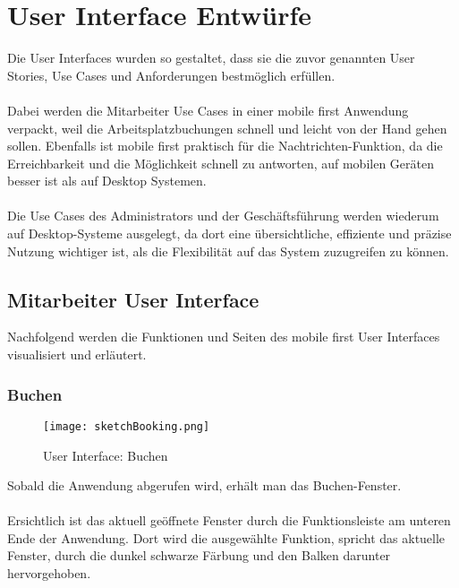 \section{User Interface Entwürfe}

Die User Interfaces wurden so gestaltet, dass sie die zuvor genannten User Stories, Use Cases und Anforderungen bestmöglich erfüllen. 
\paragraph{}Dabei werden die Mitarbeiter Use Cases in einer mobile first Anwendung verpackt, weil die Arbeitsplatzbuchungen schnell und leicht von der Hand gehen sollen.
Ebenfalls ist mobile first praktisch für die Nachtrichten-Funktion, da die Erreichbarkeit und die Möglichkeit schnell zu antworten, auf mobilen Geräten besser ist als auf Desktop Systemen. 
\paragraph{}Die Use Cases des Administrators und der Geschäftsführung werden wiederum auf Desktop-Systeme ausgelegt, da dort eine übersichtliche, effiziente und präzise Nutzung wichtiger ist, als die Flexibilität auf das System zuzugreifen zu können. 

\subsection{Mitarbeiter User Interface}

Nachfolgend werden die Funktionen und Seiten des mobile first User Interfaces visualisiert und erläutert. 

\subsubsection{Buchen}

\begin{wrapfigure}{r}{5.5cm}
    \texttt{[image: sketchBooking.png]}
    \caption{User Interface: Buchen}
  \end{wrapfigure}

Sobald die Anwendung abgerufen wird, erhält man das Buchen-Fenster.
\paragraph{}Ersichtlich ist das aktuell geöffnete Fenster durch die Funktionsleiste am unteren Ende der Anwendung. 
Dort wird die ausgewählte Funktion, spricht das aktuelle Fenster, durch die dunkel schwarze Färbung und den Balken darunter hervorgehoben.
